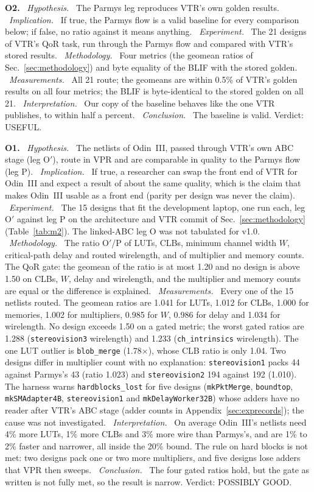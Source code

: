 \documentclass[conference]{IEEEtran}
\newcommand{\code}[1]{\texttt{#1}}
\newcommand{\argid}[1]{\par\smallskip\noindent\textbf{#1.}}
\newcommand{\ah}[1]{\ \textit{#1.}\ }
\begin{document}
\argid{O2}
\ah{Hypothesis} The Parmys leg reproduces VTR's own golden results.
\ah{Implication} If true, the Parmys flow is a valid baseline for every comparison below; if false, no ratio against it means anything.
\ah{Experiment} The 21 designs of VTR's QoR task, run through the Parmys flow and compared with VTR's stored results.
\ah{Methodology} Four metrics (the geomean ratios of Sec.~\ref{sec:methodology}) and byte equality of the BLIF with the stored golden.
\ah{Measurements} All 21 route; the geomeans are within 0.5\% of VTR's golden results on all four metrics; the BLIF is byte-identical to the stored golden on all 21.
\ah{Interpretation} Our copy of the baseline behaves like the one VTR publishes, to within half a percent.
\ah{Conclusion} The baseline is valid. Verdict: USEFUL.

\argid{O1}
\ah{Hypothesis} The netlists of Odin~III, passed through VTR's own ABC stage (leg O$'$), route in VPR and are comparable in quality to the Parmys flow (leg P).
\ah{Implication} If true, a researcher can swap the front end of VTR for Odin~III and expect a result of about the same quality, which is the claim that makes Odin~III usable as a front end (parity per design was never the claim).
\ah{Experiment} The 15 designs that fit the development laptop, one run each, leg O$'$ against leg P on the architecture and VTR commit of Sec.~\ref{sec:methodology} (Table~\ref{tab:m2}). The linked-ABC leg O was not tabulated for v1.0.
\ah{Methodology} The ratio O$'$/P of LUTs, CLBs, minimum channel width $W$, critical-path delay and routed wirelength, and of multiplier and memory counts. The QoR gate: the geomean of the ratio is at most 1.20 and no design is above 1.50 on CLBs, $W$, delay and wirelength, and the multiplier and memory counts are equal or the difference is explained.
\ah{Measurements} Every one of the 15 netlists routed. The geomean ratios are 1.041 for LUTs, 1.012 for CLBs, 1.000 for memories, 1.002 for multipliers, 0.985 for $W$, 0.986 for delay and 1.034 for wirelength. No design exceeds 1.50 on a gated metric; the worst gated ratios are 1.288 (\code{stereovision3} wirelength) and 1.233 (\code{ch\_intrinsics} wirelength). The one LUT outlier is \code{blob\_merge} (1.78$\times$), whose CLB ratio is only 1.04. Two designs differ in multiplier count with no explanation: \code{stereovision1} packs 44 against Parmys's 43 (ratio 1.023) and \code{stereovision2} 194 against 192 (1.010). The harness warns \code{hardblocks\_lost} for five designs (\code{mkPktMerge}, \code{boundtop}, \code{mkSMAdapter4B}, \code{stereovision1} and \code{mkDelayWorker32B}) whose adders have no reader after VTR's ABC stage (adder counts in Appendix~\ref{sec:exprecords}); the cause was not investigated.
\ah{Interpretation} On average Odin~III's netlists need 4\% more LUTs, 1\% more CLBs and 3\% more wire than Parmys's, and are 1\% to 2\% faster and narrower, all inside the 20\% bound. The rule on hard blocks is not met: two designs pack one or two more multipliers, and five designs lose adders that VPR then sweeps.
\ah{Conclusion} The four gated ratios hold, but the gate as written is not fully met, so the result is narrow. Verdict: POSSIBLY GOOD.
\end{document}
